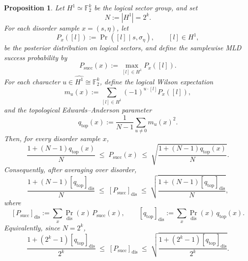 \documentclass[twoside,english,aps,showpacs,pra,superscriptaddress]{revtex4-2}
\newtheorem{proposition}{Proposition}
\begin{document}
\begin{proposition}
Let $H^1\simeq \mathbb F_2^k$ be the logical sector group, and set
\[
N:=|H^1|=2^k.
\]
For each disorder sample $x=(s,\eta)$, let
\begin{equation}\label{eq:posterior-sector}
P_x([l]) := \Pr([l]\mid s,\sigma_\eta), \qquad [l]\in H^1,
\end{equation}
be the posterior distribution on logical sectors, and define the samplewise MLD success probability by
\begin{equation}\label{eq:psucc-sample}
P_{\mathrm{succ}}(x):=\max_{[l]\in H^1} P_x([l]).
\end{equation}
For each character $u\in \widehat{H^1}\cong \mathbb F_2^k$, define the logical Wilson expectation
\begin{equation}\label{eq:logical-wilson}
m_u(x):=\sum_{[l]\in H^1} (-1)^{u\cdot [l]} P_x([l]),
\end{equation}
and the topological Edwards--Anderson parameter
\begin{equation}\label{eq:qtop-def}
q_{\mathrm{top}}(x):=\frac{1}{N-1}\sum_{u\neq 0} m_u(x)^2.
\end{equation}
Then, for every disorder sample $x$,
\begin{equation}\label{eq:sample-two-sided}
\frac{1+(N-1)q_{\mathrm{top}}(x)}{N}
\;\le\;
P_{\mathrm{succ}}(x)
\;\le\;
\sqrt{\frac{1+(N-1)q_{\mathrm{top}}(x)}{N}}.
\end{equation}
Consequently, after averaging over disorder,
\begin{equation}\label{eq:disorder-two-sided}
\frac{1+(N-1)[q_{\mathrm{top}}]_{\mathrm{dis}}}{N}
\;\le\;
[P_{\mathrm{succ}}]_{\mathrm{dis}}
\;\le\;
\sqrt{\frac{1+(N-1)[q_{\mathrm{top}}]_{\mathrm{dis}}}{N}},
\end{equation}
where
\[
[P_{\mathrm{succ}}]_{\mathrm{dis}}:=\sum_x \Pr_{\mathrm{dis}}(x)\,P_{\mathrm{succ}}(x),
\qquad
[q_{\mathrm{top}}]_{\mathrm{dis}}:=\sum_x \Pr_{\mathrm{dis}}(x)\,q_{\mathrm{top}}(x).
\]
Equivalently, since $N=2^k$,
\begin{equation}\label{eq:disorder-two-sided-2k}
\frac{1+(2^k-1)[q_{\mathrm{top}}]_{\mathrm{dis}}}{2^k}
\;\le\;
[P_{\mathrm{succ}}]_{\mathrm{dis}}
\;\le\;
\sqrt{\frac{1+(2^k-1)[q_{\mathrm{top}}]_{\mathrm{dis}}}{2^k}}.
\end{equation}
\end{proposition}
\end{document}
